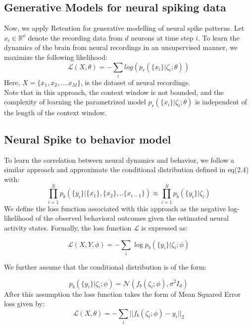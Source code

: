 \subsection{Generative Models for neural spiking data}
Now, we apply Retention for generative modelling of neural spike patterns. Let $x_i \in \mathbb{R^d}$ denote the recording data from $d$ neurons at time step $i$. To learn the dynamics of the brain from neural recordings in an unsupervised manner, we maximize the following likelihood:
\begin{equation}
    \mathcal{L}(X,\theta) = -\sum_i log(p_r(\{x_{i}\}|\zeta_i;\theta))
\end{equation}
Here, $X = \{x_1,x_2,....x_M\}$, is the dataset of neural recordings. \\

Note that in this approach, the context window is not bounded, and the complexity of learning the parametrized model $p_r(\{x_{i}\}|\zeta_i;\theta)$ is independent of the length of the context window.
 \\

 \subsection{Neural Spike to behavior model }

 To learn the correlation between neural dynamics and behavior, we follow a similar approach and approximate the conditional distribution defined in eq(2.4) with:
\\
 \begin{equation}
   \prod_{i=1}^{N} p_b(\{y_{i}\}| \{x_1\},\{x_2\},..\{x_{i-1}\}) 
   \approx  \prod_{i=1}^{N} p_b(\{y_{i}\}|\zeta_i)
\end{equation}
We define the loss function associated with this approach as the negative log-likelihood of the observed behavioral outcomes given the estimated neural activity states. Formally, the loss function \( \mathcal{L} \) is expressed as:

\[
\mathcal{L}(X,Y,\phi) = -\sum_{i} \log p_b(\{y_i\}|\zeta_i;\phi)
\]

We further assume that the conditional distribution is of the form:

\begin{equation}
p_b(\{y_i\}|\zeta_i;\phi) = \mathbf{\mathcal{N}}(f_b(\zeta_i;\phi), \sigma^2 I_d)
\end{equation}
After this assumption the loss function takes the form of Mean Squared Error loss given by:
\begin{equation}
    \mathcal{L}(X,\theta) = -\sum_i ||f_b(\zeta_i;\phi) - y_i||_2
\end{equation}
